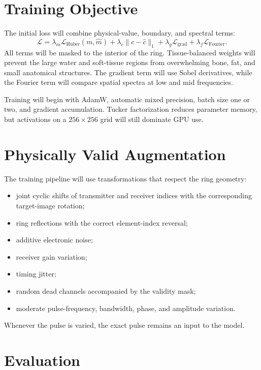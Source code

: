 \documentclass[11pt]{article}
\begin{document}
\section{Training Objective}

The initial loss will combine physical-value, boundary, and spectral terms:
\begin{equation}
  \mathcal{L}=
  \lambda_m\mathcal{L}_{\mathrm{Huber}}(m,\widehat{m})
  +\lambda_c\lVert c-\widehat{c}\rVert_1
  +\lambda_g\mathcal{L}_{\mathrm{grad}}
  +\lambda_f\mathcal{L}_{\mathrm{Fourier}}.
\end{equation}
All terms will be masked to the interior of the ring. Tissue-balanced weights
will prevent the large water and soft-tissue regions from overwhelming bone,
fat, and small anatomical structures. The gradient term will use Sobel
derivatives, while the Fourier term will compare spatial spectra at low and
mid frequencies.

Training will begin with AdamW, automatic mixed precision, batch size one or
two, and gradient accumulation. Tucker factorization reduces parameter memory,
but activations on a $256\times256$ grid will still dominate GPU use.

\section{Physically Valid Augmentation}

The training pipeline will use transformations that respect the ring
geometry:
\begin{itemize}
  \item joint cyclic shifts of transmitter and receiver indices with the
        corresponding target-image rotation;
  \item ring reflections with the correct element-index reversal;
  \item additive electronic noise;
  \item receiver gain variation;
  \item timing jitter;
  \item random dead channels accompanied by the validity mask;
  \item moderate pulse-frequency, bandwidth, phase, and amplitude variation.
\end{itemize}
Whenever the pulse is varied, the exact pulse remains an input to the model.

\section{Evaluation}
\end{document}
